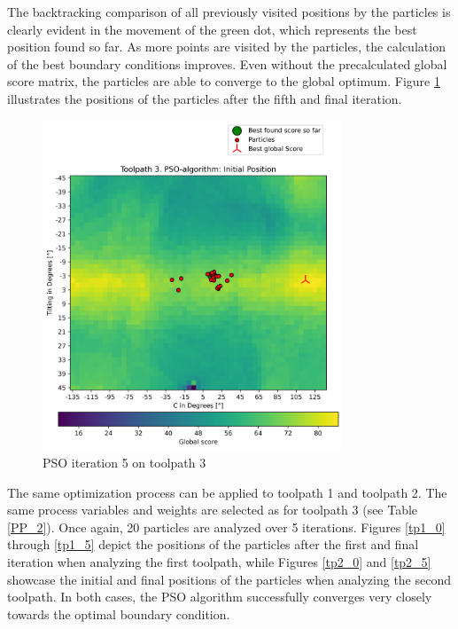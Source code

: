 The backtracking comparison of all previously visited positions by the particles is clearly evident in the movement of the green dot, which represents the best position found so far. As more points are visited by the particles, the calculation of the best boundary conditions improves. Even without the precalculated global score matrix, the particles are able to converge to the global optimum.
Figure \ref{5_true} illustrates the positions of the particles after the fifth and final iteration.

\begin{figure}[H]
	\centerline{\includegraphics[width=0.8\textwidth]{figures/swarm_true/3_5.png}}
	\caption{PSO iteration 5 on toolpath 3}
	\label{5_true}
\end{figure}



The same optimization process can be applied to toolpath 1 and toolpath 2. The same process variables and weights are selected as for toolpath 3 (see Table \ref{PP_2}). Once again, 20 particles are analyzed over 5 iterations. Figures \ref{tp1_0} through \ref{tp1_5} depict the positions of the particles after the first and final iteration when analyzing the first toolpath, while Figures \ref{tp2_0} and \ref{tp2_5} showcase the initial and final positions of the particles when analyzing the second toolpath. In both cases, the PSO algorithm successfully converges very closely towards the optimal boundary condition.

